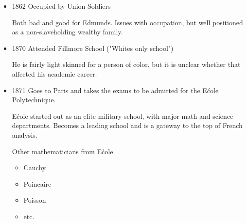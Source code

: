 \documentclass{report}
\begin{document}
\begin{description}
\begin{mdframed}
\begin{itemize}
                \item 1862 Occupied by Union Soldiers
                    \begin{mdframed}
                        Both bad and good for Edmunds. Issues
                        with occupation, but well positioned
                        as a non-slaveholding wealthy family.
                    \end{mdframed}
                \item 1870 Attended Fillmore School ("Whites only
                    school")
                    \begin{mdframed}
                        He is fairly light skinned for a person
                        of color, but it is unclear whether
                        that affected his academic career.
                    \end{mdframed}
                \item 1871 Goes to Paris and takes the exams
                    to be admitted for the E\'cole Polytechnique.
                    \begin{mdframed}
                        E\'cole started out as an elite military
                        school, with major math and science
                        departments. Becomes a leading school
                        and is a gateway to the top of French
                        analysis.

                        \vspace{10pt}

                        Other mathematicians from E\'cole
                        \begin{itemize}
                            \item Cauchy
                            \item Poincaire
                            \item Poisson
                            \item etc.
                        \end{itemize}

                        \vspace{10pt}


\end{mdframed}
\end{itemize}
\end{mdframed}
\end{description}
\end{document}
